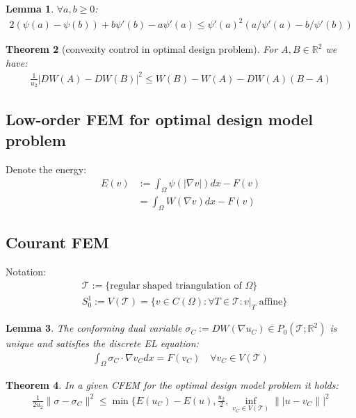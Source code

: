 \documentclass[a4paper,12pt,oneside,fleqn]{book}
\newtheorem{theorem}{Theorem}[section]
\newtheorem{lemma}[theorem]{Lemma}
\theoremstyle{definition}
\theoremstyle{remark}
\begin{document}
\begin{lemma}
	$\forall a, b \geq 0$: 
	\begin{align*}
		2(\psi(a) - \psi(b)) + b\psi'(b) - a\psi'(a) \le \psi'(a)^2 (a \slash \psi'(a) - b\slash \psi'(b))
	\end{align*}
\end{lemma}

\begin{theorem}[convexity control in optimal design problem]
	For $A, B \in \mathbb{R}^2$ we have:
	\begin{align*}
		\frac{1}{u_2}| DW(A) - DW(B)|^2 \le W(B) - W(A) - DW(A)(B - A)
	\end{align*}
\end{theorem}


\subsection{Low-order FEM for optimal design model problem}
Denote the energy:
\begin{align*}
	E(v)&:= \int_\Omega \psi(|\nabla v|) dx - F(v)\\
	&= \int_\Omega W(\nabla v) dx - F(v)  
\end{align*}


\subsection{Courant FEM}
Notation: 
\begin{align*}
	&\mathcal{T}:= \{\text{regular shaped triangulation of $\Omega$}\}\\
	&S_0^1:= V(\mathcal{T}) = \{v \in C(\Omega): \forall T \in \mathcal{T}: v|_T  \text{ affine} \} 
\end{align*}

\begin{lemma}
	The conforming dual variable $\sigma_C:=DW(\nabla u_C) \in P_0(\mathcal{T};\mathbb{R}^2)$ is unique and satisfies the discrete EL equation:
	\begin{align*}
		\int_\Omega \sigma_C \cdot \nabla v_C dx = F(v_C) \quad \forall v_C \in V(\mathcal{T})
	\end{align*}
\end{lemma}

\begin{theorem}
	In a given CFEM for the optimal design model problem it holds:
	\begin{align*}
		\frac{1}{2 u_2}\|\sigma - \sigma_C\|^2 \le \min \{ E(u_C) - E(u), \frac{u_2}{2}, \inf_{v_C \in V(\mathcal{T})} \||u - v_C\||^2
	\end{align*}
\end{theorem}
\end{document}
